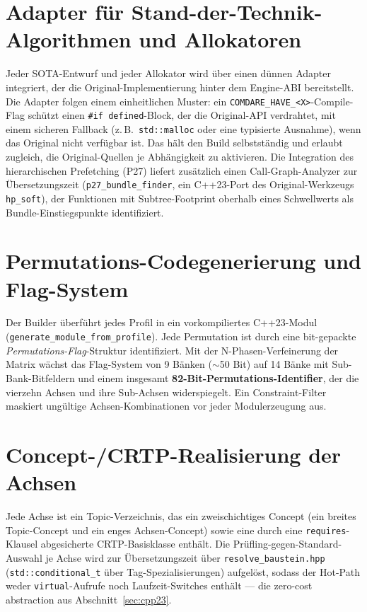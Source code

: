 \section{Adapter für Stand-der-Technik-Algorithmen und Allokatoren}\label{sec:adapters}

Jeder SOTA-Entwurf und jeder Allokator wird über einen dünnen Adapter integriert, der die
Original-Implementierung hinter dem Engine-ABI bereitstellt. Die Adapter folgen einem
einheitlichen Muster: ein \texttt{COMDARE\_HAVE\_<X>}-Compile-Flag schützt einen
\texttt{\#if defined}-Block, der die Original-API verdrahtet, mit einem sicheren Fallback
(z.\,B.\ \texttt{std::malloc} oder eine typisierte Ausnahme), wenn das Original nicht verfügbar
ist. Das hält den Build selbstständig und erlaubt zugleich, die Original-Quellen je
Abhängigkeit zu aktivieren. Die Integration des hierarchischen Prefetching (P27) liefert
zusätzlich einen Call-Graph-Analyzer zur Übersetzungszeit (\texttt{p27\_bundle\_finder}, ein
C++23-Port des Original-Werkzeugs \texttt{hp\_soft}), der Funktionen mit
Subtree-Footprint oberhalb eines Schwellwerts als Bundle-Einstiegspunkte identifiziert.

\section{Permutations-Codegenerierung und Flag-System}\label{sec:codegen}

Der Builder überführt jedes Profil in ein vorkompiliertes C++23-Modul
(\texttt{generate\_module\_from\_profile}). Jede Permutation ist durch eine bit-gepackte
\emph{Permutations-Flag}-Struktur identifiziert. Mit der N-Phasen-Verfeinerung der Matrix
wächst das Flag-System von 9 Bänken ($\sim$50 Bit) auf 14 Bänke mit Sub-Bank-Bitfeldern und
einem insgesamt \textbf{82-Bit-Permutations-Identifier}, der die vierzehn Achsen und ihre
Sub-Achsen widerspiegelt. Ein Constraint-Filter maskiert ungültige Achsen-Kombinationen vor
jeder Modulerzeugung aus.

\section{Concept-/CRTP-Realisierung der Achsen}\label{sec:concept-crtp}

Jede Achse ist ein Topic-Verzeichnis, das ein zweischichtiges Concept (ein breites
Topic-Concept und ein enges Achsen-Concept) sowie eine durch eine \texttt{requires}-Klausel
abgesicherte CRTP-Basisklasse enthält. Die Prüfling-gegen-Standard-Auswahl je Achse wird zur
Übersetzungszeit über \texttt{resolve\_baustein.hpp} (\texttt{std::conditional\_t} über
Tag-Spezialisierungen) aufgelöst, sodass der Hot-Path weder \texttt{virtual}-Aufrufe noch
Laufzeit-Switches enthält --- die zero-cost abstraction aus Abschnitt~\ref{sec:cpp23}.

